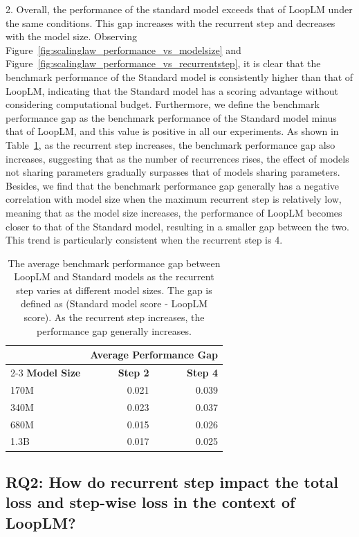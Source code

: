 \documentclass[]{bytedance_seed}
\newcommand{\1}{\mathbf{1}}
\newcommand{\ut}{LoopLM}
\begin{document}
{2. Overall, the performance of the standard model exceeds that of \ut{} under the same conditions. This gap increases with the recurrent step and decreases with the model size. Observing Figure~\ref{fig:scalinglaw_performance_vs_modelsize} and Figure~\ref{fig:scalinglaw_performance_vs_recurrentstep}, it is clear that the benchmark performance of the Standard model is consistently higher than that of \ut{}, indicating that the Standard model has a scoring advantage without considering computational budget. Furthermore, we define the benchmark performance gap as the benchmark performance of the Standard model minus that of \ut{}, and this value is positive in all our experiments. As shown in Table~\ref{tab:scalinglaw_performancegap}, as the recurrent step increases, the benchmark performance gap also increases, suggesting that as the number of recurrences rises, the effect of models not sharing parameters gradually surpasses that of models sharing parameters. Besides, we find that the benchmark performance gap generally has a negative correlation with model size when the maximum recurrent step is relatively low, meaning that as the model size increases, the performance of \ut{} becomes closer to that of the Standard model, resulting in a smaller gap between the two. This trend is particularly consistent when the recurrent step is 4.

\begin{table}[htbp!]
    \centering
    \small
    \caption{The average benchmark performance gap between \ut{} and Standard models as the recurrent step varies at different model sizes. The gap is defined as (Standard model score - \ut{} score). As the recurrent step increases, the performance gap generally increases.}
    \label{tab:scalinglaw_performancegap}
    \begin{tabular}{@{}lrr@{}}
    \toprule
     & \multicolumn{2}{c}{\textbf{Average Performance Gap}} \\
    \cmidrule(lr){2-3}
    \textbf{Model Size} & \textbf{Step 2} & \textbf{Step 4} \\
    \midrule
    170M & 0.021 & 0.039 \\
    340M & 0.023 & 0.037 \\
    680M & 0.015 & 0.026 \\
    1.3B & 0.017 & 0.025 \\
    \bottomrule
    \end{tabular}
\end{table}


\subsection{RQ2: How do recurrent step impact the total loss and step-wise loss in the context of \ut{}?}
\label{scaling_law_sub_2}

}
\end{document}

